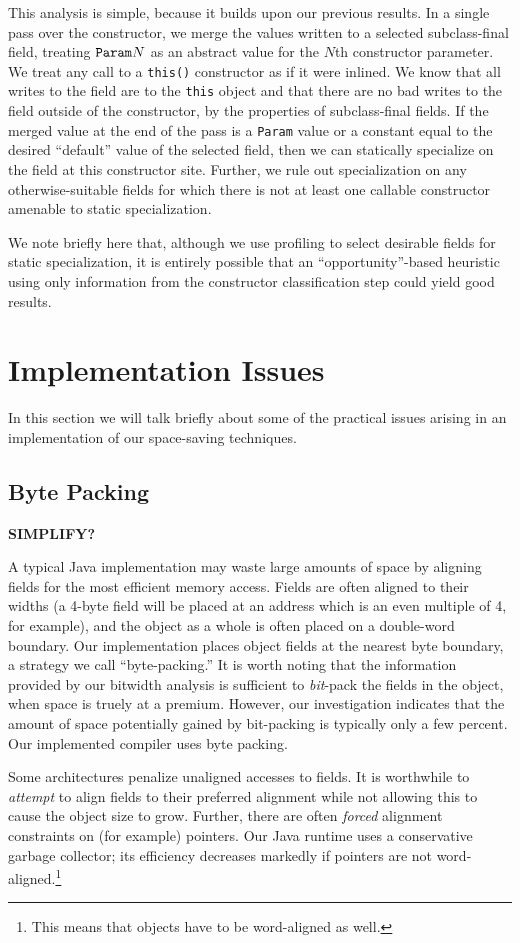 \documentclass[oribibl]{llncs}
\begin{document}
This analysis is simple, because it builds upon our previous results.
In a single pass over the constructor, we merge the values written
to a selected subclass-final field, treating $\text{\tt Param}N$ as an
abstract value for the $N$th constructor parameter.
We treat any call to a {\tt this()}
constructor as if it were inlined.  We know that all writes to the
field are to the {\tt this} object and that there are no bad writes to
the field outside of the constructor, by the properties of
subclass-final fields. If the merged value at the end of the pass 
is a {\tt Param} value or a constant equal to the desired ``default''
value of the selected field,
then we can statically specialize on the field at this constructor
site.  Further, we rule out specialization on any otherwise-suitable
fields for which there is not at least one callable constructor
amenable to static specialization.

We note briefly here that, although we use profiling to select desirable
fields for static specialization, it is entirely possible that an
``opportunity''-based heuristic using only information from the constructor
classification step could yield good results.
%
\section{Implementation Issues}
%
In this section we will talk briefly about some of the practical
issues arising in an implementation of our space-saving techniques.
%
\subsection{Byte Packing}
%
\textbf{SIMPLIFY?}

A typical Java implementation may waste large amounts of space by
aligning fields for the most efficient memory access.  Fields are
often aligned to their widths (a 4-byte field will be placed at an address
which is an even multiple of 4, for example), and the object as a
whole is often placed on a double-word boundary. Our implementation
places object fields at the nearest byte boundary, a strategy we
call ``byte-packing.''
It is worth noting that the information provided by our bitwidth
analysis is sufficient to {\it bit}-pack the fields in the object,
when space is truely at a premium.  However, our investigation
indicates that the amount of space potentially gained by bit-packing 
is typically only a few percent.  Our implemented compiler uses byte
packing.

Some architectures penalize unaligned accesses to fields.  It is
worthwhile to {\it attempt} to align fields to their preferred
alignment while not allowing this to cause the object size to grow.
Further, there are often {\it forced} alignment constraints on
(for example) pointers.  Our Java runtime uses a conservative garbage
collector; its efficiency decreases markedly if pointers are not
word-aligned.\footnote{This means that objects have to be word-aligned
  as well.}
\end{document}
